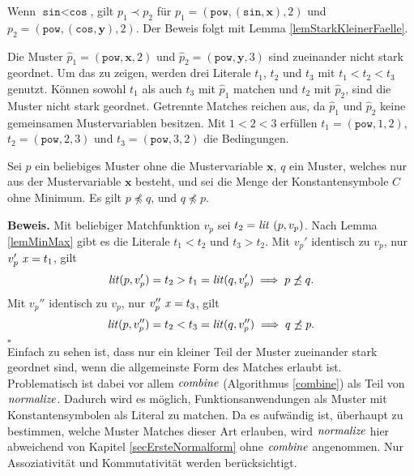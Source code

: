\begin{beispiel}
Wenn $\texttt{sin} < \texttt{cos}$, gilt $p_1 \prec p_2$ für $p_1 = (\texttt{pow}, (\texttt{sin}, \mathbf x), 2)$ und $p_2 = (\texttt{pow}, (\texttt{cos}, \mathbf y), 2)$. Der Beweis folgt mit Lemma \ref{lemStarkKleinerFaelle}.

Die Muster $\hat p_1 = (\texttt{pow}, \mathbf x, 2)$ und $\hat p_2 = (\texttt{pow}, \mathbf y, 3)$ sind zueinander nicht stark geordnet. 
Um das zu zeigen, werden drei Literale $t_1$, $t_2$ und $t_3$ mit ${t_1 < t_2 < t_3}$ genutzt.
Können sowohl $t_1$ als auch $t_3$ mit $\hat p_1$ matchen und $t_2$ mit $\hat p_2$, sind die Muster nicht stark geordnet. Getrennte Matches reichen aus, da $\hat p_1$ und $\hat p_2$ keine gemeinsamen Mustervariablen besitzen.
 Mit $1 < 2 < 3$ erfüllen $t_1 = (\texttt{pow}, 1, 2)$, $t_2 = (\texttt{pow}, 2, 3)$ und $t_3 = (\texttt{pow}, 3, 2)$ die Bedingungen.
\end{beispiel}

\begin{lemma}
Sei $p$ ein beliebiges Muster ohne die Mustervariable $\mathbf x$, $q$ ein Muster, welches nur aus der Mustervariable $\mathbf x$ besteht, und sei die Menge der Konstantensymbole $C$ ohne Minimum.
Es gilt $p \not\preceq q$, und $q \not\preceq p$.
\end{lemma}

\textbf{Beweis.}
Mit beliebiger Matchfunktion $v_p$ sei $t_2 = \mathit{lit}~(p, v_p)$. Nach Lemma \ref{lemMinMax} gibt es die Literale $t_1 < t_2$ und $t_3 > t_2$. 
Mit $v_p'$ identisch zu $v_p$, nur $v_p'~\mathit{x} = t_1$, gilt 
$$\mathit{lit}(p, v_p') = t_2 > t_1 = \mathit{lit}(q, v_p') \implies p \not\preceq q.$$
Mit $v_p''$ identisch zu $v_p$, nur $v_p''~\mathit{x} = t_3$, gilt 
$$\mathit{lit}(p, v_p'') = t_2 < t_3 = \mathit{lit}(q, v_p'') \implies q \not\preceq p.$$
\hfill $\square$\\


Einfach zu sehen ist, dass nur ein kleiner Teil der Muster zueinander stark geordnet sind, wenn die allgemeinste Form des Matches erlaubt ist. Problematisch ist dabei vor allem $\mathit{combine}$ (Algorithmus \ref{combine}) als Teil von $\mathit{normalize}$. Dadurch wird es möglich, Funktionsanwendungen als Muster mit Konstantensymbolen als Literal zu matchen. Da es aufwändig ist, überhaupt zu bestimmen, welche Muster Matches dieser Art erlauben, wird $\mathit{normalize}$ hier abweichend von Kapitel \ref{secErsteNormalform} ohne $\mathit{combine}$ angenommen. Nur Assoziativität und Kommutativität werden berücksichtigt.

